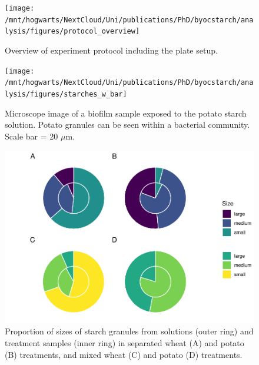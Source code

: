 \documentclass[utf8]{frontiers/frontiersSCNS}
\begin{document}
\begin{figure}[H]

{\centering \texttt{[image: /mnt/hogwarts/NextCloud/Uni/publications/PhD/byocstarch/analysis/figures/protocol\_overview]} 

}

\caption{Overview of experiment protocol including the plate setup.}\label{fig:protocol-fig}
\end{figure}

\begin{figure}[H]

{\centering \texttt{[image: /mnt/hogwarts/NextCloud/Uni/publications/PhD/byocstarch/analysis/figures/starches\_w\_bar]} 

}

\caption{Microscope image of a biofilm sample exposed to the potato starch solution. Potato granules can be seen within a bacterial community. Scale bar = 20 $\mu$m.}\label{fig:microscope-fig}
\end{figure}

\begin{figure}[H]

{\centering \includegraphics{../figures/ratio-plots-1} 

}

\caption{Proportion of sizes of starch granules from solutions (outer ring) and treatment samples (inner ring) in separated wheat (A) and potato (B) treatments, and mixed wheat (C) and potato (D) treatments.}\label{fig:ratio-plots}
\end{figure}
\end{document}
